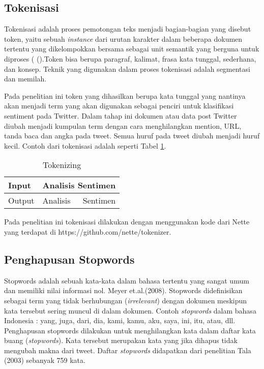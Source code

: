 \subsection*{Tokenisasi}
Tokenisasi adalah proses pemotongan teks menjadi bagian-bagian yang disebut token, yaitu sebuah \textit{instance} dari urutan karakter dalam beberapa dokumen tertentu yang dikelompokkan bersama sebagai unit semantik yang berguna untuk diproses (\citeauthor{MANNING2008} (\cite*{MANNING2008}).Token bisa berupa paragraf, kalimat, frasa kata tunggal,  sederhana,  dan konsep. Teknik yang digunakan dalam proses tokenisasi adalah segmentasi dan memilah.

Pada penelitian ini token yang dihasilkan berupa kata tunggal yang nantinya akan menjadi term yang akan digunakan sebagai penciri untuk klasifikasi sentiment pada Twitter. Dalam tahap ini dokumen atau data post Twitter diubah menjadi kumpulan term dengan cara menghilangkan mention, URL, tanda baca dan angka pada tweet. Semua huruf pada tweet diubah menjadi huruf kecil. Contoh dari tokenisasi adalah seperti Tabel \ref{tab:tokenizing}.

\begin{table}[hbt]
	\caption{Tokenizing}
	\centering
	\begin{tabular}{llr}
		\toprule
		Input & \multicolumn{2}{c}{Analisis Sentimen} \\
		\midrule
		Output & Analisis & Sentimen \\
		\bottomrule
	\end{tabular}
	\label{tab:tokenizing}
\end{table}

Pada penelitian ini tokenisasi dilakukan dengan menggunakan kode dari Nette yang terdapat di https://github.com/nette/tokenizer.


\subsection*{Penghapusan Stopwords}

Stopwords adalah sebuah kata-kata dalam bahasa tertentu yang sangat umum dan memiliki nilai informasi nol. Meyer et.al.(2008). Stopwords didefinisikan sebagai term yang tidak berhubungan (\textit{irrelevant}) dengan dokumen meskipun kata tersebut sering muncul di dalam dokumen. Contoh \textit{stopwords} dalam bahasa  Indonesia : yang, juga, dari, dia, kami, kamu, aku, saya, ini, itu, atau, dll.
Penghapusan stopwords dilakukan untuk menghilangkan kata dalam daftar kata buang (\textit{stopwords}). Kata tersebut merupakan kata yang jika dihapus tidak mengubah makna dari tweet. Daftar \textit{stopwords} didapatkan dari penelitian Tala (2003) sebanyak 759 kata.


